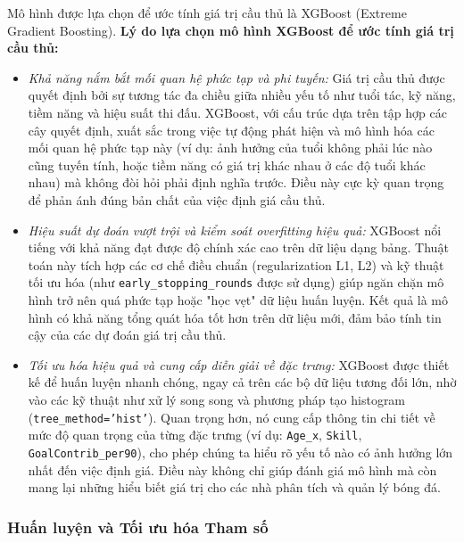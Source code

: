\documentclass[12pt, a4paper]{report}
\begin{document}
Mô hình được lựa chọn để ước tính giá trị cầu thủ là XGBoost (Extreme Gradient Boosting).
\textbf{Lý do lựa chọn mô hình XGBoost để ước tính giá trị cầu thủ:}
\begin{itemize}
    \item \textit{Khả năng nắm bắt mối quan hệ phức tạp và phi tuyến:} Giá trị cầu thủ được quyết định bởi sự tương tác đa chiều giữa nhiều yếu tố như tuổi tác, kỹ năng, tiềm năng và hiệu suất thi đấu. XGBoost, với cấu trúc dựa trên tập hợp các cây quyết định, xuất sắc trong việc tự động phát hiện và mô hình hóa các mối quan hệ phức tạp này (ví dụ: ảnh hưởng của tuổi không phải lúc nào cũng tuyến tính, hoặc tiềm năng có giá trị khác nhau ở các độ tuổi khác nhau) mà không đòi hỏi phải định nghĩa trước. Điều này cực kỳ quan trọng để phản ánh đúng bản chất của việc định giá cầu thủ.
    \item \textit{Hiệu suất dự đoán vượt trội và kiểm soát overfitting hiệu quả:} XGBoost nổi tiếng với khả năng đạt được độ chính xác cao trên dữ liệu dạng bảng. Thuật toán này tích hợp các cơ chế điều chuẩn (regularization L1, L2) và kỹ thuật tối ưu hóa (như \texttt{early\_stopping\_rounds} được sử dụng) giúp ngăn chặn mô hình trở nên quá phức tạp hoặc "học vẹt" dữ liệu huấn luyện. Kết quả là mô hình có khả năng tổng quát hóa tốt hơn trên dữ liệu mới, đảm bảo tính tin cậy của các dự đoán giá trị cầu thủ.
    \item \textit{Tối ưu hóa hiệu quả và cung cấp diễn giải về đặc trưng:} XGBoost được thiết kế để huấn luyện nhanh chóng, ngay cả trên các bộ dữ liệu tương đối lớn, nhờ vào các kỹ thuật như xử lý song song và phương pháp tạo histogram (\texttt{tree\_method='hist'}). Quan trọng hơn, nó cung cấp thông tin chi tiết về mức độ quan trọng của từng đặc trưng (ví dụ: \texttt{Age\_x}, \texttt{Skill}, \texttt{GoalContrib\_per90}), cho phép chúng ta hiểu rõ yếu tố nào có ảnh hưởng lớn nhất đến việc định giá. Điều này không chỉ giúp đánh giá mô hình mà còn mang lại những hiểu biết giá trị cho các nhà phân tích và quản lý bóng đá.
\end{itemize}

\subsubsection{Huấn luyện và Tối ưu hóa Tham số}
\end{document}
